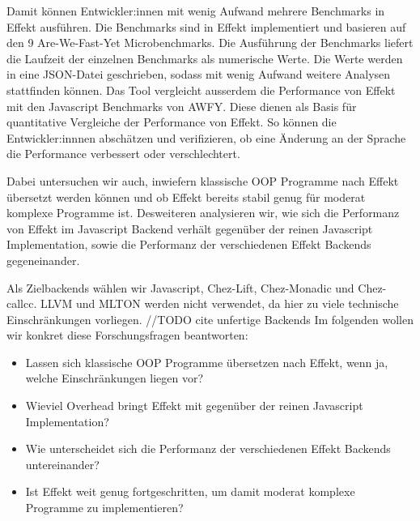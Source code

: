 Damit können Entwickler:innen mit wenig Aufwand mehrere Benchmarks in Effekt ausführen.
Die Benchmarks sind in Effekt implementiert und basieren auf den 9 Are-We-Fast-Yet Microbenchmarks.
Die Ausführung der Benchmarks liefert die Laufzeit der einzelnen Benchmarks als numerische Werte. Die Werte werden in eine JSON-Datei geschrieben, sodass mit wenig Aufwand weitere Analysen stattfinden können.
Das Tool vergleicht ausserdem die Performance von Effekt mit den Javascript Benchmarks von AWFY. Diese dienen als Basis für quantitative Vergleiche der Performance von Effekt.
So können die Entwickler:innnen abschätzen und verifizieren, ob eine Änderung an der Sprache die Performance verbessert oder verschlechtert.

\medskip
Dabei untersuchen wir auch, inwiefern klassische OOP Programme nach Effekt übersetzt werden können und ob Effekt bereits stabil genug für moderat komplexe Programme ist.  
Desweiteren analysieren wir, wie sich die Performanz von Effekt im Javascript Backend verhält gegenüber der reinen Javascript Implementation, sowie die Performanz der verschiedenen Effekt Backends gegeneinander.

\medskip
Als Zielbackends wählen wir Javascript, Chez-Lift, Chez-Monadic und Chez-callcc.
LLVM und MLTON werden nicht verwendet, da hier zu viele technische Einschränkungen vorliegen. //TODO cite unfertige Backends
\medskip
Im folgenden wollen wir konkret diese Forschungsfragen beantworten:
\begin{itemize}
    \item Lassen sich klassische OOP Programme übersetzen nach Effekt, wenn ja, welche Einschränkungen liegen vor?
    \item Wieviel Overhead bringt Effekt mit gegenüber der reinen Javascript Implementation?
    \item Wie unterscheidet sich die Performanz der verschiedenen Effekt Backends untereinander?
    \item Ist Effekt weit genug fortgeschritten, um damit moderat komplexe Programme zu implementieren?
\end{itemize}


  